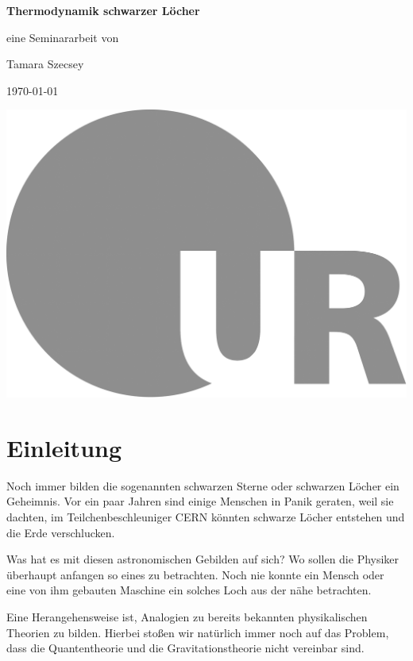 \documentclass[ngerman]{scrartcl}
\begin{document}
 
	\begin{titlepage}
		\begin{minipage}[c][\textheight][c]{\textwidth}
			\begin{center}
				{ \Huge \textbf{Thermodynamik schwarzer Löcher} }
				
				\vspace*{1cm}
				{\large eine Seminararbeit von}
				
				\vspace*{0.2cm}
				{\Large Tamara Szecsey}
				
				\vspace*{1cm}
				{\large \today}
				
				\vspace*{4cm}
				\hspace*{1cm} \includegraphics[height=30ex]{LOGO_UR}
			\end{center}
		\end{minipage}
	\end{titlepage}
	
\tableofcontents
\newpage

\section{Einleitung}

Noch immer bilden die sogenannten schwarzen Sterne oder schwarzen Löcher ein Geheimnis. Vor ein paar Jahren sind einige Menschen in Panik geraten, weil sie dachten, im Teilchenbeschleuniger CERN könnten schwarze Löcher entstehen und die Erde verschlucken.

Was hat es mit diesen astronomischen Gebilden auf sich? Wo sollen die Physiker überhaupt anfangen so eines zu betrachten. Noch nie konnte ein Mensch oder eine von ihm gebauten Maschine ein solches Loch aus der nähe betrachten. 

Eine Herangehensweise ist, Analogien zu bereits bekannten physikalischen Theorien zu bilden. Hierbei stoßen wir natürlich immer noch auf das Problem, dass die Quantentheorie und die Gravitationstheorie nicht vereinbar sind.
\end{document}
